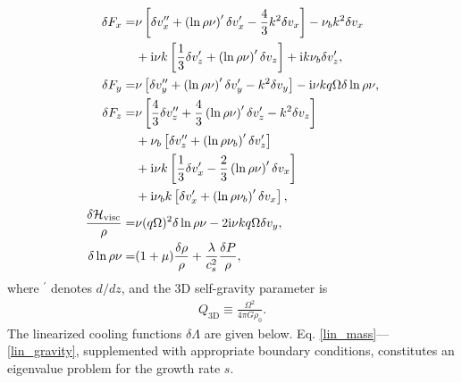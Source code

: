 \begin{align}
  \delta F_x =& \nu \left[\delta v_x^{\prime\prime} + 
    \left(\ln{\rho\nu}\right)^\prime \delta v_x^\prime - 
     \frac{4}{3}k^2\delta v_x \right] - \nu_bk^2\delta v_x \notag\\
   &+ \mathrm{i} \nu k \left[\frac{1}{3}\delta v_z^\prime+ 
    \left(\ln{\rho\nu}\right)^\prime\delta v_z\right] + \mathrm{i} k \nu_b
  \delta v_z^\prime,\\
  \delta F_y = & \nu  \left[\delta v_y^{\prime\prime} + 
    \left(\ln{\rho\nu}\right)^\prime \delta v_y^\prime - 
     k^2\delta v_y \right] - \mathrm{i}\nu kq\Omega\delta\ln{\rho\nu},\\
  \delta F_z =& \nu\left[\frac{4}{3}\delta v_z^{\prime\prime} + 
    \frac{4}{3}\left(\ln{\rho\nu}\right)^\prime \delta v_z^\prime - 
    k^2\delta v_z \right] \notag\\
  & +\nu_b\left[\delta v_z^{\prime\prime} + \left(\ln{\rho\nu_b}\right)^\prime\delta v_z^\prime\right]\notag\\
  & + \mathrm{i} \nu k  \left[\frac{1}{3}\delta v_x^\prime -  
    \frac{2}{3}\left(\ln{\rho\nu}\right)^\prime\delta v_x\right]\notag\\
  &+\mathrm{i} \nu_b k \left[\delta v_x^\prime + \left(\ln{\rho\nu_b}\right)^\prime\delta v_x\right],\\
  \frac{\delta\mathcal{H}_\mathrm{visc}}{\rho}=& \nu (q\Omega)^2
  \delta\ln{\rho\nu} - 2\mathrm{i}\nu k q \Omega \delta v_y,\\
  \delta\ln{\rho\nu} =& (1+\mu)\frac{\delta\rho}{\rho} +
  \frac{\lambda}{c_s^2}\frac{\delta P}{\rho}, \label{linear_beta_cool}
\end{align}
where $^\prime$ denotes $d/dz$, and the 3D self-gravity parameter is
\begin{align}
  Q_\mathrm{3D} \equiv \frac{\Omega^2}{4\pi G \rho_0}. 
\end{align}
The linearized cooling functions $\delta\Lambda$ are given below. 
Eq. \ref{lin_mass}---\ref{lin_gravity}, supplemented with appropriate
boundary conditions, constitutes an eigenvalue problem for the growth
rate $s$. 

